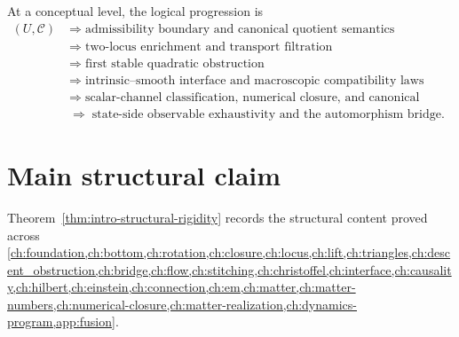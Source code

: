 At a conceptual level, the logical progression is
\[
		\begin{aligned}
			(U,\mathcal C)
			\;&\Longrightarrow\;\text{admissibility boundary and canonical quotient semantics}
			\\
			\;&\Longrightarrow\;\text{two-locus enrichment and transport filtration}
			\\
			\;&\Longrightarrow\;\text{first stable quadratic obstruction}
			\\
			\;&\Longrightarrow\;\text{intrinsic--smooth interface and macroscopic compatibility laws}
			\\
			\;&\Longrightarrow\;\text{scalar-channel classification, numerical closure, and canonical realization}
			\\
			\;&\Longrightarrow\;\text{state-side observable exhaustivity and the automorphism bridge}.
		\end{aligned}
	\]

\section{Main structural claim}
Theorem~\ref{thm:intro-structural-rigidity} records the structural
content proved across
\cref{ch:foundation,ch:bottom,ch:rotation,ch:closure,ch:locus,ch:lift,ch:triangles,ch:descent_obstruction,ch:bridge,ch:flow,ch:stitching,ch:christoffel,ch:interface,ch:causality,ch:hilbert,ch:einstein,ch:connection,ch:em,ch:matter,ch:matter-numbers,ch:numerical-closure,ch:matter-realization,ch:dynamics-program,app:fusion}.

